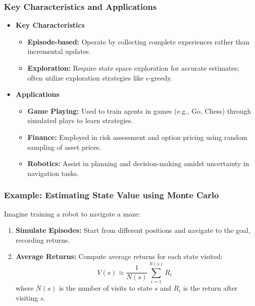 \documentclass[aspectratio=169]{beamer}
\begin{document}
\begin{frame}[fragile]
    \frametitle{Key Characteristics and Applications}
    \begin{itemize}
        \item \textbf{Key Characteristics}
        \begin{itemize}
            \item \textbf{Episode-based:} Operate by collecting complete experiences rather than incremental updates.
            \item \textbf{Exploration:} Require state space exploration for accurate estimates; often utilize exploration strategies like $\epsilon$-greedy.
        \end{itemize}
        
        \item \textbf{Applications}
        \begin{itemize}
            \item \textbf{Game Playing:} Used to train agents in games (e.g., Go, Chess) through simulated plays to learn strategies.
            \item \textbf{Finance:} Employed in risk assessment and option pricing using random sampling of asset prices.
            \item \textbf{Robotics:} Assist in planning and decision-making amidst uncertainty in navigation tasks.
        \end{itemize}
    \end{itemize}
\end{frame}

\begin{frame}[fragile]
    \frametitle{Example: Estimating State Value using Monte Carlo}
    Imagine training a robot to navigate a maze:
    \begin{enumerate}
        \item \textbf{Simulate Episodes:} Start from different positions and navigate to the goal, recording returns.
        \item \textbf{Average Returns:} Compute average returns for each state visited:
        \begin{equation}
            V(s) \approx \frac{1}{N(s)} \sum_{i=1}^{N(s)} R_i
        \end{equation}
        where \(N(s)\) is the number of visits to state \(s\) and \(R_i\) is the return after visiting \(s\).
    \end{enumerate}
\end{frame}
\end{document}
